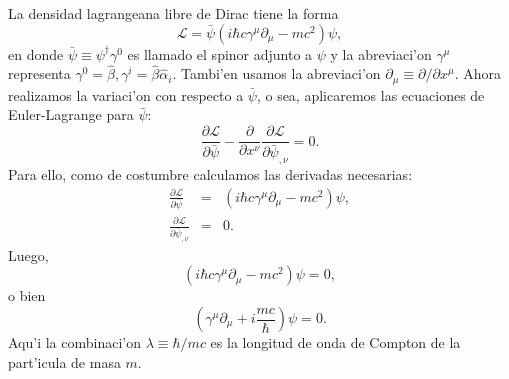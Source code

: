 La densidad lagrangeana libre de Dirac tiene la forma 
\begin{equation}
\mathcal{L}=\bar{\psi}\left( i\hbar c\gamma^{\mu }\partial _{\mu
}-mc^2\right) \psi ,
\end{equation}
en donde $\bar{\psi}\equiv \psi^{\dagger }\gamma^0$ es llamado el spinor
adjunto a $\psi $ y la abreviaci'on $\gamma^{\mu }$ representa $\gamma
^0=\hat{\beta},\gamma^i=\hat{\beta}\hat{\alpha}_i$. Tambi'en
usamos la abreviaci'on $\partial _{\mu }\equiv \partial /\partial x^{\mu
} $. Ahora realizamos la variaci'on con respecto a $\bar{\psi}$, o sea,
aplicaremos las ecuaciones de Euler-Lagrange para $\bar{\psi}$: 
\begin{equation}
\frac{\partial \mathcal{L}}{\partial \bar{\psi}}-\frac{\partial }{\partial
x^\nu }\frac{\partial \mathcal{L}}{\partial \bar{\psi}_{,\nu }}=0.
\end{equation}
Para ello, como de costumbre calculamos las derivadas necesarias: 
\begin{eqnarray*}
\frac{\partial \mathcal{L}}{\partial \bar{\psi}} &=&\left( i\hbar c\gamma
^{\mu }\partial _{\mu }-mc^2\right) \psi , \\
\frac{\partial \mathcal{L}}{\partial \bar{\psi}_{,\nu }} &=&0.
\end{eqnarray*}
Luego, 
\begin{equation}
\left( i\hbar c\gamma^{\mu }\partial _{\mu }-mc^2\right) \psi =0,
\label{Dirac2}
\end{equation}
o bien 
\begin{equation}
\left( \gamma^{\mu }\partial _{\mu }+i\frac{mc}{\hbar }\right) \psi =0.
\end{equation}
Aqu'i la combinaci'on $\lambda \equiv \hbar /mc$ es la longitud de
onda de Compton de la part'icula de masa $m$.

